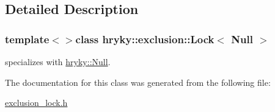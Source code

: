 \subsection{Detailed Description}
\subsubsection*{template$<$$>$class hryky\-::exclusion\-::\-Lock$<$ Null $>$}

specializes with \hyperlink{classhryky_1_1_null}{hryky\-::\-Null}. 

The documentation for this class was generated from the following file\-:\begin{DoxyCompactItemize}
\item 
\hyperlink{exclusion__lock_8h}{exclusion\-\_\-lock.\-h}\end{DoxyCompactItemize}
